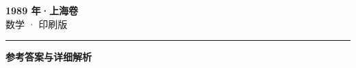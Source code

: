 \documentclass[zihao=5, a4paper]{ctexart}
\begin{document}
\begin{center}
  {\Large\bfseries 1989 年·上海卷}\\[4pt]
  {\large 数学 · 印刷版}
\end{center}
\medskip
{}

\par\bigskip\hrule\bigskip
{}
\begin{center}{\large\bfseries 参考答案与详细解析}\end{center}
\smallskip

\end{document}
